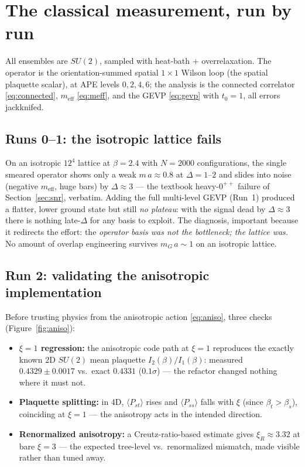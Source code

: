 \documentclass[11pt,a4paper]{article}
\newcommand{\meff}{m_{\mathrm{eff}}}
\begin{document}
\section{The classical measurement, run by run}
\label{sec:classical}

All ensembles are $SU(2)$, sampled with heat-bath + overrelaxation. The
operator is the orientation-summed spatial $1\times1$ Wilson loop
(the spatial plaquette scalar), at APE levels $0,2,4,6$; the analysis is the
connected correlator \eqref{eq:connected}, $\meff$ \eqref{eq:meff}, and the
GEVP \eqref{eq:gevp} with $t_0=1$, all errors jackknifed.

\subsection{Runs 0--1: the isotropic lattice fails}

On an isotropic $12^4$ lattice at $\beta=2.4$ with $N=2000$ configurations,
the single smeared operator shows only a weak $m\,a\approx0.8$ at
$\Delta=1$--$2$ and slides into noise (negative $\meff$, huge bars) by
$\Delta\approx3$ --- the textbook heavy-$0^{++}$ failure of
Section~\ref{sec:snr}, verbatim. Adding the full multi-level GEVP (Run~1)
produced a flatter, lower ground state but still \emph{no plateau}: with the
signal dead by $\Delta\approx3$ there is nothing late-$\Delta$ for any basis
to exploit. The diagnosis, important because it redirects the effort: the
\emph{operator basis was not the bottleneck; the lattice was.} No amount of
overlap engineering survives $m_G\,a\sim1$ on an isotropic lattice.

\subsection{Run 2: validating the anisotropic implementation}

Before trusting physics from the anisotropic action \eqref{eq:aniso}, three
checks (Figure~\ref{fig:aniso}):
\begin{itemize}
  \item \textbf{$\xi=1$ regression:} the anisotropic code path at $\xi=1$
  reproduces the exactly known 2D $SU(2)$ mean plaquette
  $I_2(\beta)/I_1(\beta)$: measured $0.4329\pm0.0017$ vs.\ exact $0.4331$
  ($0.1\sigma$) --- the refactor changed nothing where it must not.
  \item \textbf{Plaquette splitting:} in 4D, $\langle P_{st}\rangle$ rises and
  $\langle P_{ss}\rangle$ falls with $\xi$ (since $\beta_t>\beta_s$),
  coinciding at $\xi=1$ --- the anisotropy acts in the intended direction.
  \item \textbf{Renormalized anisotropy:} a Creutz-ratio-based estimate gives
  $\xi_R \approx 3.32$ at bare $\xi=3$ --- the expected tree-level vs.\
  renormalized mismatch, made visible rather than tuned away.
\end{itemize}
\end{document}
